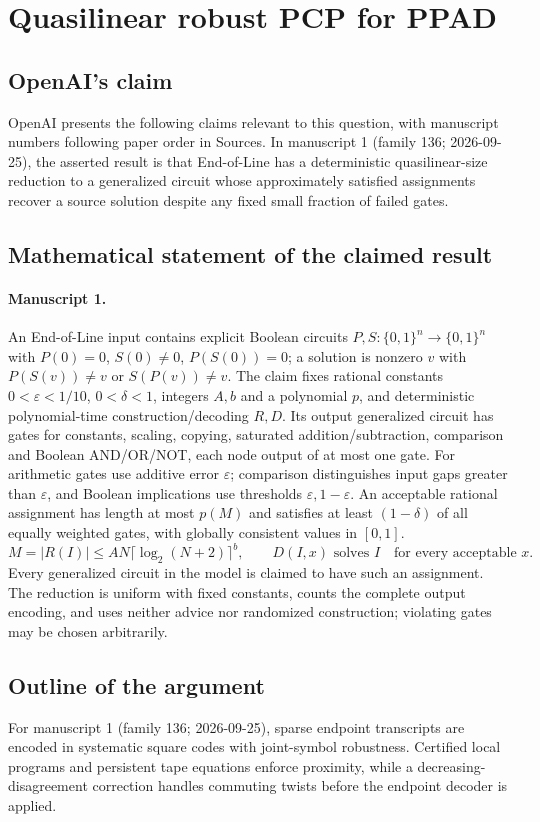 \documentclass[11pt]{article}
\begin{document}
\section*{Quasilinear robust PCP for PPAD}

\subsection{OpenAI's claim}
OpenAI presents the following claims relevant to this question, with manuscript numbers following paper order in Sources. In manuscript 1 (family 136; 2026-09-25), the asserted result is that End-of-Line has a deterministic quasilinear-size reduction to a generalized circuit whose approximately satisfied assignments recover a source solution despite any fixed small fraction of failed gates.

\subsection{Mathematical statement of the claimed result}
\paragraph{Manuscript 1.}
An End-of-Line input contains explicit Boolean circuits $P,S:\{0,1\}^n\to\{0,1\}^n$ with $P(0)=0$, $S(0)\ne0$, $P(S(0))=0$; a solution is nonzero $v$ with $P(S(v))\ne v$ or $S(P(v))\ne v$. The claim fixes rational constants $0<\varepsilon<1/10$, $0<\delta<1$, integers $A,b$ and a polynomial $p$, and deterministic polynomial-time construction/decoding $R,D$. Its output generalized circuit has gates for constants, scaling, copying, saturated addition/subtraction, comparison and Boolean AND/OR/NOT, each node output of at most one gate. For arithmetic gates use additive error $\varepsilon$; comparison distinguishes input gaps greater than $\varepsilon$, and Boolean implications use thresholds $\varepsilon,1-\varepsilon$. An acceptable rational assignment has length at most $p(M)$ and satisfies at least $(1-\delta)$ of all equally weighted gates, with globally consistent values in $[0,1]$.
\[
 M=|R(I)|\le AN\lceil\log_2(N+2)\rceil^b,
 \qquad D(I,x)\text{ solves }I\quad\text{for every acceptable }x.
\]
Every generalized circuit in the model is claimed to have such an assignment. The reduction is uniform with fixed constants, counts the complete output encoding, and uses neither advice nor randomized construction; violating gates may be chosen arbitrarily.

\subsection{Outline of the argument}
For manuscript 1 (family 136; 2026-09-25), sparse endpoint transcripts are encoded in systematic square codes with joint-symbol robustness. Certified local programs and persistent tape equations enforce proximity, while a decreasing-disagreement correction handles commuting twists before the endpoint decoder is applied.
\end{document}
